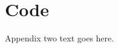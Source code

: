 \documentclass[10pt,journal,compsoc]{IEEEtran}
\begin{document}
\section{Code}
Appendix two text goes here.






\ifCLASSOPTIONcaptionsoff
  \newpage
\fi




\end{document}
